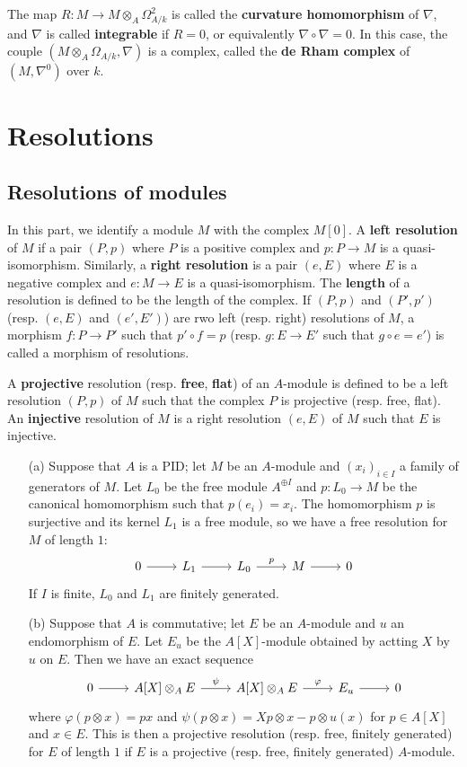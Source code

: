 The map $R:M\to M\otimes_A\Omega_{A/k}^2$ is called the \textbf{curvature homomorphism} of $\nabla$, and $\nabla$ is called \textbf{integrable} if $R=0$, or equivalently $\nabla\circ\nabla=0$. In this case, the couple $(M\otimes_A\Omega_{A/k},\nabla)$ is a complex, called the \textbf{de Rham complex} of $(M,\nabla^0)$ over $k$.
\section{Resolutions}
\subsection{Resolutions of modules}
In this part, we identify a module $M$ with the complex $M[0]$. A \textbf{left resolution} of $M$ if a pair $(P,p)$ where $P$ is a positive complex and $p:P\to M$ is a quasi-isomorphism. Similarly, a \textbf{right resolution} is a pair $(e,E)$ where $E$ is a negative complex and $e:M\to E$ is a quasi-isomorphism. The \textbf{length} of a resolution is defined to be the length of the complex. If $(P,p)$ and $(P',p')$ (resp. $(e,E)$ and $(e',E')$) are rwo left (resp. right) resolutions of $M$, a morphism $f:P\to P'$ such that $p'\circ f=p$ (resp. $g:E\to E'$ such that $g\circ e=e'$) is called a morphism of resolutions.\par
A \textbf{projective} resolution (resp. \textbf{free}, \textbf{flat}) of an $A$-module is defined to be a left resolution $(P,p)$ of $M$ such that the complex $P$ is projective (resp. free, flat). An \textbf{injective} resolution of $M$ is a right resolution $(e,E)$ of $M$ such that $E$ is injective.
\begin{example}
\mbox{}
\begin{itemize}
\item[(a)] Suppose that $A$ is a PID; let $M$ be an $A$-module and $(x_i)_{i\in I}$ a family of generators of $M$. Let $L_0$ be the free module $A^{\oplus I}$ and $p:L_0\to M$ be the canonical homomorphism such that $p(e_i)=x_i$. The homomorphism $p$ is surjective and its kernel $L_1$ is a free module, so we have a free resolution for $M$ of length $1$:
\[\begin{tikzcd}
0\ar[r]&L_1\ar[r]&L_0\ar[r,"p"]&M\ar[r]&0
\end{tikzcd}\]
If $I$ is finite, $L_0$ and $L_1$ are finitely generated.
\item[(b)] Suppose that $A$ is commutative; let $E$ be an $A$-module and $u$ an endomorphism of $E$. Let $E_u$ be the $A[X]$-module obtained by actting $X$ by $u$ on $E$. Then we have an exact sequence
\[\begin{tikzcd}
0\ar[r]&A[X]\otimes_AE\ar[r,"\psi"]&A[X]\otimes_AE\ar[r,"\varphi"]&E_u\ar[r]&0
\end{tikzcd}\] 
where $\varphi(p\otimes x)=px$ and $\psi(p\otimes x)=Xp\otimes x-p\otimes u(x)$ for $p\in A[X]$ and $x\in E$. This is then a projective resolution (resp. free, finitely generated) for $E$ of length $1$ if $E$ is a projective (resp. free, finitely generated) $A$-module. 
\end{itemize}
\end{example}
